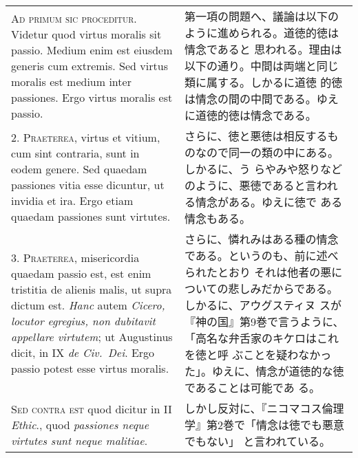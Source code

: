 \documentclass[10pt]{jsarticle}
\begin{document}
\begin{longtable}{p{21em}p{21em}}

{\scshape Ad primum sic proceditur}. Videtur quod virtus moralis sit
passio. Medium enim est eiusdem generis cum extremis. Sed virtus
moralis est medium inter passiones. Ergo virtus moralis est passio.

&

 第一項の問題へ、議論は以下のように進められる。道徳的徳は情念であると
 思われる。理由は以下の通り。中間は両端と同じ類に属する。しかるに道徳
 的徳は情念の間の中間である。ゆえに道徳的徳は情念である。
 
\\



2. {\scshape Praeterea}, virtus et vitium, cum sint contraria, sunt in
eodem genere. Sed quaedam passiones vitia esse dicuntur, ut invidia et
ira. Ergo etiam quaedam passiones sunt virtutes.

&

 さらに、徳と悪徳は相反するものなので同一の類の中にある。しかるに、う
 らやみや怒りなどのように、悪徳であると言われる情念がある。ゆえに徳で
 ある情念もある。
 
\\



3. {\scshape Praeterea}, misericordia quaedam passio est, est enim
tristitia de alienis malis, ut supra dictum est. {\itshape Hanc} autem
{\itshape Cicero, locutor egregius, non dubitavit appellare virtutem};
ut Augustinus dicit, in IX {\itshape de Civ.~Dei}. Ergo passio potest
esse virtus moralis.

&

 さらに、憐れみはある種の情念である。というのも、前に述べられたとおり
 それは他者の悪についての悲しみだからである。しかるに、アウグスティヌ
 スが『神の国』第9巻で言うように、「高名な弁舌家のキケロはこれを徳と呼
 ぶことを疑わなかった」。ゆえに、情念が道徳的な徳であることは可能であ
 る。

 
\\


{\scshape Sed contra est} quod dicitur in II {\itshape Ethic}., quod
{\itshape passiones neque virtutes sunt neque malitiae}.

&

しかし反対に、『ニコマコス倫理学』第2巻で「情念は徳でも悪意でもない」
と言われている。
 
\\




\end{longtable}
\end{document}
